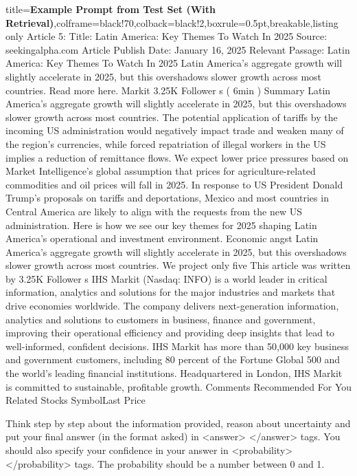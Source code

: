 \documentclass{article} %
\begin{document}
\begin{tcblisting}{title={\textbf{Example Prompt from Test Set (With Retrieval)}},colframe=black!70,colback=black!2,boxrule=0.5pt,breakable,listing only}
Article 5:
Title: Latin America: Key Themes To Watch In 2025
Source: seekingalpha.com
Article Publish Date: January 16, 2025
Relevant Passage: Latin America: Key Themes To Watch In 2025 Latin America's aggregate growth will slightly accelerate in 2025, but this overshadows slower growth across most countries. Read more here. Markit 3.25K Follower s ( 6min ) Summary Latin America's aggregate growth will slightly accelerate in 2025, but this overshadows slower growth across most countries. The potential application of tariffs by the incoming US administration would negatively impact trade and weaken many of the region's currencies, while forced repatriation of illegal workers in the US implies a reduction of remittance flows. We expect lower price pressures based on Market Intelligence's global assumption that prices for agriculture-related commodities and oil prices will fall in 2025. In response to US President Donald Trump's proposals on tariffs and deportations, Mexico and most countries in Central America are likely to align with the requests from the new US administration. Here is how we see our key themes for 2025 shaping Latin America's operational and investment environment. Economic angst Latin America's aggregate growth will slightly accelerate in 2025, but this overshadows slower growth across most countries. We project only five This article was written by 3.25K Follower s IHS Markit (Nasdaq: INFO) is a world leader in critical information, analytics and solutions for the major industries and markets that drive economies worldwide. The company delivers next-generation information, analytics and solutions to customers in business, finance and government, improving their operational efficiency and providing deep insights that lead to well-informed, confident decisions. IHS Markit has more than 50,000 key business and government customers, including 80 percent of the Fortune Global 500 and the world's leading financial institutions. Headquartered in London, IHS Markit is committed to sustainable, profitable growth. Comments Recommended For You Related Stocks SymbolLast Price%

Think step by step about the information provided, reason about uncertainty and put your final answer (in the format asked) in <answer> </answer> tags.
You should also specify your confidence in your answer in <probability> </probability> tags.
The probability should be a number between 0 and 1.


\end{tcblisting}
\end{document}
